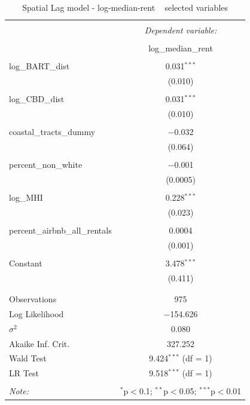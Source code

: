 \documentclass[10pt, letterpaper]{amsart}
\begin{document}
\begin{table}[!htbp] \centering 
  \caption{Spatial Lag model - log-median-rent ~ selected variables} 
  \label{} 
  \begin{tabular}{@{\extracolsep{5pt}}lc} 
    \\[-1.8ex]\hline 
    \hline \\[-1.8ex] 
    & \multicolumn{1}{c}{\textit{Dependent variable:}} \\ 
    \cline{2-2} 
    \\[-1.8ex] & log\_median\_rent \\ 
    \hline \\[-1.8ex] 
    log\_BART\_dist & 0.031$^{***}$ \\ 
    & (0.010) \\ 
    & \\ 
    log\_CBD\_dist & 0.031$^{***}$ \\ 
    & (0.010) \\ 
    & \\ 
    coastal\_tracts\_dummy & $-$0.032 \\ 
    & (0.064) \\ 
    & \\ 
    percent\_non\_white & $-$0.001 \\ 
    & (0.0005) \\ 
    & \\ 
    log\_MHI & 0.228$^{***}$ \\ 
    & (0.023) \\ 
    & \\ 
    percent\_airbnb\_all\_rentals & 0.0004 \\ 
    & (0.001) \\ 
    & \\ 
    Constant & 3.478$^{***}$ \\ 
    & (0.411) \\ 
    & \\ 
    \hline \\[-1.8ex] 
    Observations & 975 \\ 
    Log Likelihood & $-$154.626 \\ 
    $\sigma^{2}$ & 0.080 \\ 
    Akaike Inf. Crit. & 327.252 \\ 
    Wald Test & 9.424$^{***}$ (df = 1) \\ 
    LR Test & 9.518$^{***}$ (df = 1) \\ 
    \hline 
    \hline \\[-1.8ex] 
    \textit{Note:}  & \multicolumn{1}{r}{$^{*}$p$<$0.1; $^{**}$p$<$0.05; $^{***}$p$<$0.01} \\ 
  \end{tabular} 
\end{table} 
\end{document}
